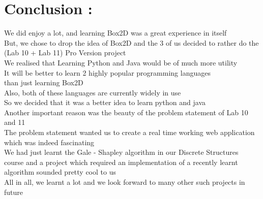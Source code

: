 \documentclass{article}
\begin{document}
\section{Conclusion : }
\hspace*{5 mm}We did enjoy a lot, and learning Box2D was a great experience in itself \\
\hspace*{5 mm}But, we chose to drop the idea of Box2D and the 3 of us decided to rather do the \\
\hspace*{5 mm}(Lab 10 + Lab 11) Pro Version project \\
\hspace*{5 mm}We realised that Learning Python and Java would be of much more utility \\
\hspace*{5 mm}It will be better to learn 2 highly popular programming languages \\
\hspace*{5 mm}than just learning Box2D \\
\hspace*{5 mm}Also, both of these languages are currently widely in use \\
\hspace*{5 mm}So we decided that it was a better idea to learn python and java \\
\hspace*{5 mm}Another important reason was the beauty of the problem statement of Lab 10 and 11 \\
\hspace*{5 mm}The problem statement wanted us to create a real time working web application \\
\hspace*{5 mm}which was indeed fascinating \\
\hspace*{5 mm}We had just learnt the Gale - Shapley algorithm in our Discrete Structures \\
\hspace*{5 mm}course and a project which required an implementation of a recently learnt \\
\hspace*{5 mm}algorithm sounded pretty cool to us \\
\hspace*{5 mm}All in all, we learnt a lot and we look forward to many other such projects in future \\
\end{document}
